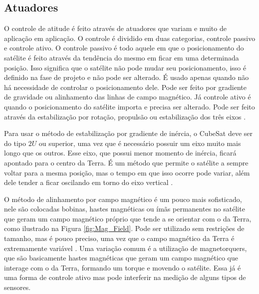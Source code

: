 \documentclass[
	12pt,				%
	openany,			%
	twoside,			%
	a4paper,			%
	english,			%
	french,				%
	spanish,			%
	brazil,				%
	oldfontcommands
	]{abntex2}
\begin{document}
\newpage

\subsection{Atuadores}

O controle de atitude é feito através de atuadores que variam e muito de aplicação em aplicação. O controle é dividido em duas categorias, controle passivo e controle ativo. O controle passivo é todo aquele em que o posicionamento do satélite é feito através da tendência do mesmo em ficar em uma determinada posição. Isso significa que o satélite não pode mudar seu posicionamento, isso é definido na fase de projeto e não pode ser alterado. É usado apenas quando não há necessidade de controlar o posicionamento dele. Pode ser feito por gradiente de gravidade ou alinhamento das linhas de campo magnético. Já controle ativo é quando o posicionamento do satélite importa e precisa ser alterado. Pode ser feito através da estabilização por rotação, propulsão ou estabilização dos três eixos \cite{FrancLav}.

Para usar o método de estabilização por gradiente de inércia, o CubeSat deve ser do tipo $2U$ ou superior, uma vez que é necessário possuir um eixo muito mais longo que os outros. Esse eixo, que possui menor momento de inércia, ficará apontado para o centro da Terra. É um método que permite o satélite a sempre voltar para a mesma posição, mas o tempo em que isso ocorre pode variar, além dele tender a ficar oscilando em torno do eixo vertical \cite{FrancLav}.

O método de alinhamento por campo magnético é um pouco mais sofisticado, nele são colocadas bobinas, hastes magnéticas ou ímãs permanentes no satélite que geram um campo magnético próprio que tende a se orientar com o da Terra, como ilustrado na Figura \ref{fig:Mag_Field}. Pode ser utilizado sem restrições de tamanho, mas é pouco preciso, uma vez que o campo magnético da Terra é extremamente variável \cite{FrancLav}. Uma variação comum é a utilização de magnetorquers, que são basicamente hastes magnéticas que geram um campo magnético que interage com o da Terra, formando um torque e movendo o satélite. Essa já é uma forma de controle ativo mas pode interferir na medição de alguns tipos de sensores.
\end{document}
